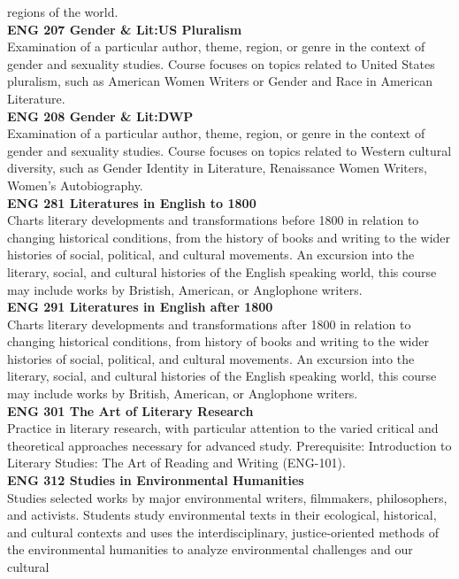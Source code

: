 \documentclass[
  letterpaper,
]{scrbook}
\begin{document}
regions of the world.\\
\textbf{ENG 207 Gender \& Lit:US Pluralism}\\
Examination of a particular author, theme, region, or genre in the
context of gender and sexuality studies. Course focuses on topics
related to United States pluralism, such as American Women Writers or
Gender and Race in American Literature.\\
\textbf{ENG 208 Gender \& Lit:DWP}\\
Examination of a particular author, theme, region, or genre in the
context of gender and sexuality studies. Course focuses on topics
related to Western cultural diversity, such as Gender Identity in
Literature, Renaissance Women Writers, Women's Autobiography.\\
\textbf{ENG 281 Literatures in English to 1800}\\
Charts literary developments and transformations before 1800 in relation
to changing historical conditions, from the history of books and writing
to the wider histories of social, political, and cultural movements. An
excursion into the literary, social, and cultural histories of the
English speaking world, this course may include works by Bristish,
American, or Anglophone writers.\\
\textbf{ENG 291 Literatures in English after 1800}\\
Charts literary developments and transformations after 1800 in relation
to changing historical conditions, from history of books and writing to
the wider histories of social, political, and cultural movements. An
excursion into the literary, social, and cultural histories of the
English speaking world, this course may include works by British,
American, or Anglophone writers.\\
\textbf{ENG 301 The Art of Literary Research}\\
Practice in literary research, with particular attention to the varied
critical and theoretical approaches necessary for advanced study.
Prerequisite: Introduction to Literary Studies: The Art of Reading and
Writing (ENG-101).\\
\textbf{ENG 312 Studies in Environmental Humanities}\\
Studies selected works by major environmental writers, filmmakers,
philosophers, and activists. Students study environmental texts in their
ecological, historical, and cultural contexts and uses the
interdisciplinary, justice-oriented methods of the environmental
humanities to analyze environmental challenges and our cultural
\end{document}
